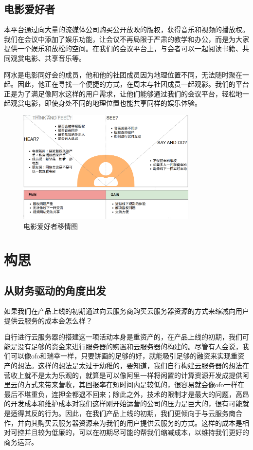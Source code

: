 \documentclass[a4paper,12pt]{article}
\begin{document}
    \subsection{电影爱好者}
    本平台通过向大量的流媒体公司购买公开放映的版权，获得音乐和视频的播放权。我们在会议中添加了娱乐功能，让会议不再局限于严肃的教学和办公，而是为大家提供一个娱乐和放松的空间。在我们的会议平台上，与会者可以一起阅读书籍、共同观赏电影、共享音乐等。

    阿水是电影同好会的成员，他和他的社团成员因为地理位置不同，无法随时聚在一起。因此，他正在寻找一个便捷的方式，在周末与社团成员一起观影。我们的平台正是为了满足像阿水这样的用户需求，让他们能够通过我们的会议平台，轻松地一起观赏电影，即使身处不同的地理位置也能共享同样的娱乐体验。
    \begin{figure}[h]
        \centering
        \includegraphics[width=0.8\textwidth]{电影爱好者移情图.png}
        \caption{电影爱好者移情图}
    \end{figure}
    \clearpage

    \section{构思}
    \subsection{从财务驱动的角度出发}
    如果我们在产品上线的初期通过向云服务商购买云服务器资源的方式来缩减向用户提供云服务的成本会怎么样？

    自行进行云服务器的搭建这一项活动本身是重资产的，在产品上线的初期，我们可能是没有足够的资金来进行服务器的购置和云服务器的构建的。尽管有人会说，我们可以像ofo和瑞幸一样，只要饼画的足够的好，就能吸引足够的融资来实现重资产的想法。这样的想法是太过于幼稚的，要知道，我们自行构建云服务器的想法在营收上就不是太为乐观的，就算是可以像阿里一样将闲置的计算资源开发成提供阿里云的方式来带来营收，其回报率在短时间内是较低的，很容易就会像ofo一样在最后不堪重负，连押金都退不回来；除此之外，技术的限制才是最大的问题，高昂的开发成本和维护成本对我们这样刚开始运营的公司的压力是巨大的，很有可能就是适得其反的行为。因此，在我们产品上线的初期，我们更倾向于与云服务商合作，并向其购买云服务器资源来为我们的用户提供云服务的方式。这样的成本是相对可控并且较为低廉的，可以在初期尽可能的帮我们缩减成本，以维持我们更好的商务运营。
\end{document}
